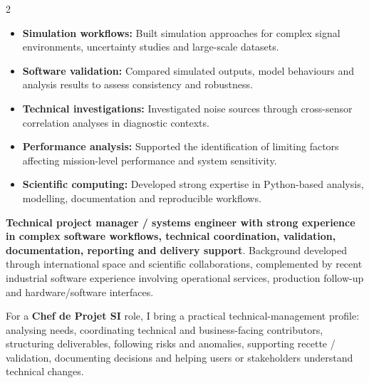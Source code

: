 \documentclass[8pt,a4paper,ragged2e,withhyper]{altacv}
\begin{document}
\begin{paracol}{2}
\begin{itemize}
  \item \textbf{Simulation workflows:} Built simulation approaches for complex signal environments, uncertainty studies and large-scale datasets.
  \item \textbf{Software validation:} Compared simulated outputs, model behaviours and analysis results to assess consistency and robustness.
  \item \textbf{Technical investigations:} Investigated noise sources through cross-sensor correlation analyses in diagnostic contexts.
  \item \textbf{Performance analysis:} Supported the identification of limiting factors affecting mission-level performance and system sensitivity.
  \item \textbf{Scientific computing:} Developed strong expertise in Python-based analysis, modelling, documentation and reproducible workflows.
\end{itemize}



\switchcolumn


\textbf{Technical project manager / systems engineer with strong experience in complex software workflows, technical coordination, validation, documentation, reporting and delivery support}. Background developed through international space and scientific collaborations, complemented by recent industrial software experience involving operational services, production follow-up and hardware/software interfaces.

For a \textbf{Chef de Projet SI} role, I bring a practical technical-management profile: analysing needs, coordinating technical and business-facing contributors, structuring deliverables, following risks and anomalies, supporting recette / validation, documenting decisions and helping users or stakeholders understand technical changes.


\end{paracol}
\end{document}
